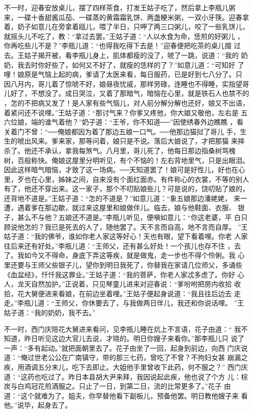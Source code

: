 不一时，迎春安放桌儿，摆了四样茶食，打发王姑子吃了，然后拿上李瓶儿粥
来，一碟十香甜酱瓜茄、一碟蒸的黄霜霜乳饼、两盏粳米粥，一双小牙筷。迎春拿
着，奶子如意儿在旁拿着瓯儿，喂了半日，只呷了两三口粥儿，咬了一些乳饼儿，
就摇头儿不吃了，教：“拿过去罢。”王姑子道：“人以水食为命，恁煎的好粥儿
，你再吃些儿不是？”李瓶儿道：“也得我吃得下去是！”迎春便把吃茶的桌儿掇
过去。王姑子揭开被，看李瓶儿身上，肌体都瘦的没了，唬了一跳，说道：“我的
奶奶，我去时你好些了，如何又不好了，就瘦的恁样的了？”如意儿道：“可知好
了哩！娘原是气恼上起的病，爹请了太医来看，每日服药，已是好到七八分了。只
因八月内，哥儿着了惊唬不好，娘昼夜忧戚，那样劳碌，连睡也不得睡，实指望哥
儿好了，不想没了。成日哭泣，又着了那暗气，暗恼在心里，就是铁石人也禁不的
，怎的不把病又发了！是人家有些气恼儿，对人前分解分解也还好，娘又不出语，
着紧问还不说哩。”王姑子道：“那讨气来？你爹又疼他，你大娘又敬他，左右是
五六位娘，端的谁气着他？”奶子道：“王爷，你不知道──”因使绣春外边瞧瞧
，看关着门不曾：“──俺娘都因为着了那边五娘一口气。──他那边猫挝了哥儿
手，生生的唬出风来。爹来家，那等问着，娘只是不说。落后大娘说了，才把那猫
来摔杀了。他还不承认，拿我每煞气。八月里，哥儿死了，他每日那边指桑树骂槐
树，百般称快。俺娘这屋里分明听见，有个不恼的！左右背地里气，只是出眼泪。
因此这样暗气暗恼，才致了这一场病。──天知道罢了！娘可是好性儿，好也在心
里，歹也在心里，姊妹之间，自来没有个面红面赤。有件称心的衣裳，不等的别人
有了，他还不穿出来。这一家子，那个不叨贴娘些儿？可是说的，饶叨贴了娘的，
还背地不道是。”王姑子道：“怎的不道是？”如意儿道：“象五娘那边潘姥姥，
来一遭，遇着爹在那边歇，就过来这屋里和娘做伴儿。临去，娘与他鞋面、衣服、
银子，甚么不与他？五娘还不道是。”李瓶儿听见，便嗔如意儿：“你这老婆，平
白只顾说他怎的？我已是死去的人了，随他罢了。天不言而自高，地不言而自厚。
”王姑子道：“我的佛爷，谁如你老人家这等好心！天也有眼，望下看着哩。你老
人家往后来还有好处。”李瓶儿道：“王师父，还有甚么好处！一个孩儿也存不住
，去了。我如今又不得命，身底下弄这等疾，就是做鬼，走一步也不得个伶俐。我
心里还要与王师父些银子儿，望你到明日我死了，你替我在家请几位师父，多诵些
《血盆经》，忏忏我这罪业。”王姑子道：“我的菩萨，你老人家忒多虑了。你好
心人，龙天自然加护。”正说着，只见琴童儿进来对迎春说：“爹吩咐把房内收拾
收拾，花大舅便进来看娘，在前边坐着哩。”王姑子便起身说道：“我且往后边去
走走。”李瓶儿道：“王师父，你休要去了，与我做两日伴儿，我还和你说话哩。
”王姑子道：“我的奶奶，我不去。”

不一时，西门庆陪花大舅进来看问，见李瓶儿睡在炕上不言语，花子由道：“
我不知道，昨日听见这边大官儿去说，才晓的。明日你嫂子来看你。”那李瓶儿只
说了一声：“多有起动。”就把面朝里去了。花子由坐了一回，起身到前边，向西
门庆说道：“俺过世老公公在广南镇守，带的那三七药，曾吃了不曾？不拘妇女甚
崩漏之疾，用酒调五分末儿，吃下去即止。大姐他手里曾收下此药，何不服之？”
西门庆道：“这药也吃过了。昨日本县胡大尹来拜，我因说起此疾，他也说了个方
儿：棕炭与白鸡冠花煎酒服之。只止了一日，到第二日，流的比常更多了。”花子
由道：“这个就难为了。姐夫，你早替他看下副板儿，预备他罢。明日教他嫂子来
看他。”说毕，起身去了。

